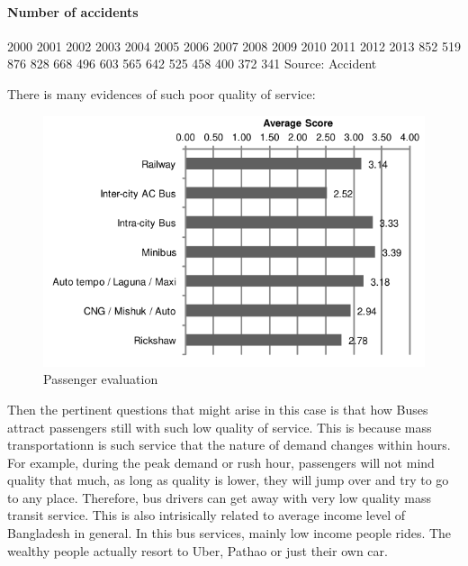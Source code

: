 \documentclass[
  11pt,
]{article}
\begin{document}
\hypertarget{number-of-accidents}{%
\paragraph{Number of accidents}\label{number-of-accidents}}

2000 2001 2002 2003 2004 2005 2006 2007 2008 2009 2010 2011 2012 2013
852 519 876 828 668 496 603 565 642 525 458 400 372 341 Source: Accident

There is many evidences of such poor quality of service:

\begin{figure}  
 \begin{center}
    \includegraphics{./figures/rtsp_evaluations.png}  
  \caption{Passenger evaluation} 
\end{center}
\end{figure}

Then the pertinent questions that might arise in this case is that how
Buses attract passengers still with such low quality of service. This is
because mass transportationn is such service that the nature of demand
changes within hours. For example, during the peak demand or rush hour,
passengers will not mind quality that much, as long as quality is lower,
they will jump over and try to go to any place. Therefore, bus drivers
can get away with very low quality mass transit service. This is also
intrisically related to average income level of Bangladesh in general.
In this bus services, mainly low income people rides. The wealthy people
actually resort to Uber, Pathao or just their own car.
\end{document}
